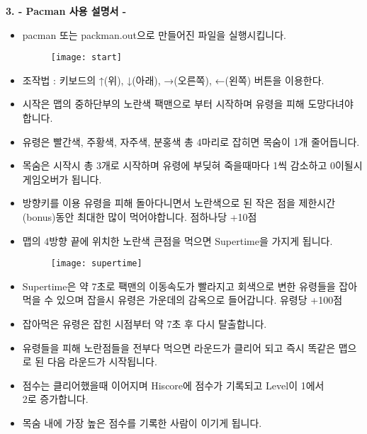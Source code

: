 \documentclass{article}
\begin{document}
\newpage
\begin{large}\textbf{3. - Pacman 사용 설명서 -}\end{large}
\begin{itemize}
\item pacman 또는 packman.out으로 만들어진 파일을 실행시킵니다.
\begin{figure}[!h]
\centering
\texttt{[image: start]}
\end{figure}
\item 조작법 : 키보드의 ↑(위), ↓(아래), →(오른쪽), ←(왼쪽) 버튼을 이용한다.
\item 시작은 맵의 중하단부의 노란색 팩맨으로 부터 시작하며 유령을 피해 도망다녀야 합니다.
\item 유령은 빨간색, 주황색, 자주색, 분홍색 총 4마리로 잡히면 목숨이 1개 줄어듭니다.
\item 목숨은 시작시 총 3개로 시작하며 유령에 부딪혀 죽을때마다 1씩 감소하고 0이될시 게임오버가 됩니다.
\item 방향키를 이용 유령을 피해 돌아다니면서 노란색으로 된 작은 점을 제한시간(bonus)동안 최대한 많이 먹어야합니다. 점하나당 +10점
\item 맵의 4방향 끝에 위치한 노란색 큰점을 먹으면 Supertime을 가지게 됩니다.
\newpage

\begin{figure}[!h]
\centering
\texttt{[image: supertime]}
\end{figure}

\item Supertime은 약 7초로 팩맨의 이동속도가 빨라지고 회색으로 변한 유령들을 잡아먹을 수 있으며 잡을시 유령은 가운데의 감옥으로 들어갑니다. 유령당 +100점
\item 잡아먹은 유령은 잡힌 시점부터 약 7초 후 다시 탈출합니다.
\item 유령들을 피해 노란점들을 전부다 먹으면 라운드가 클리어 되고 즉시 똑같은 맵으로 된 다음 라운드가 시작됩니다.
\item 점수는 클리어했을때 이어지며 Hiscore에 점수가 기록되고 Level이 1에서\\ 2로 증가합니다.
\item 목숨 내에 가장 높은 점수를 기록한 사람이 이기게 됩니다.
\end{itemize}
\end{document}
